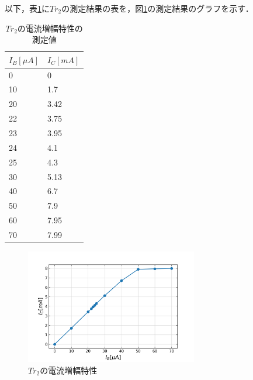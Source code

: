 \documentclass[10pt, a4j, dvipdfmx]{jarticle}
\begin{document}
    以下，表\ref{tbl:8}に$Tr_2$の測定結果の表を，図\ref{ex:8}の測定結果のグラフを示す．
    \begin{table}[H]
        \centering
        \caption{$Tr_2$の電流増幅特性の測定値}
        \label{tbl:8}
        \small
        \begin{tabular}{|l|l|}
        \hline
        $I_B[\mu A]$ & $I_C[mA]$ \\ \hline
        0            & 0         \\ \hline
        10           & 1.7       \\ \hline
        20           & 3.42      \\ \hline
        22           & 3.75      \\ \hline
        23           & 3.95      \\ \hline
        24           & 4.1       \\ \hline
        25           & 4.3       \\ \hline
        30           & 5.13      \\ \hline
        40           & 6.7       \\ \hline
        50           & 7.9       \\ \hline
        60           & 7.95      \\ \hline
        70           & 7.99      \\ \hline
        \end{tabular}
        \normalsize
    \end{table}
    \begin{figure}[H]
        \centering
        \includegraphics[height=50mm]{ex-8.png}
        \caption{$Tr_2$の電流増幅特性}
        \label{ex:8}
    \end{figure}
\end{document}
